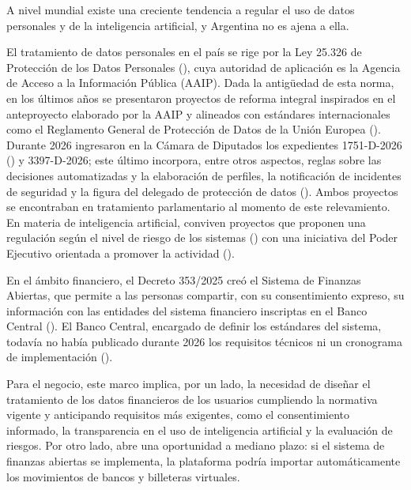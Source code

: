 A nivel mundial existe una creciente tendencia a regular el uso de datos
personales y de la inteligencia artificial, y Argentina no es ajena a
ella.

El tratamiento de datos personales en el país se rige por la Ley 25.326
de Protección de los Datos Personales (), cuya autoridad de
aplicación es la Agencia de Acceso a la Información Pública (AAIP). Dada
la antigüedad de esta norma, en los últimos años se presentaron
proyectos de reforma integral inspirados en el anteproyecto elaborado
por la AAIP y alineados con estándares internacionales como el
Reglamento General de Protección de Datos de la Unión Europea
(). Durante 2026 ingresaron en la
Cámara de Diputados los expedientes 1751-D-2026
() y 3397-D-2026;
este último incorpora, entre otros aspectos, reglas sobre las decisiones
automatizadas y la elaboración de perfiles, la notificación de
incidentes de seguridad y la figura del delegado de protección de datos
(). Ambos
proyectos se encontraban en tratamiento parlamentario al momento de este
relevamiento. En materia de inteligencia artificial, conviven proyectos
que proponen una regulación según el nivel de riesgo de los sistemas
() con una iniciativa del Poder
Ejecutivo orientada a promover la actividad
().

En el ámbito financiero, el Decreto 353/2025 creó el Sistema de Finanzas
Abiertas, que permite a las personas compartir, con su consentimiento
expreso, su información con las entidades del sistema financiero
inscriptas en el Banco Central (). El Banco Central, encargado de definir los estándares
del sistema, todavía no había publicado durante 2026 los requisitos
técnicos ni un cronograma de implementación
().

Para el negocio, este marco implica, por un lado, la necesidad de
diseñar el tratamiento de los datos financieros de los usuarios
cumpliendo la normativa vigente y anticipando requisitos más exigentes,
como el consentimiento informado, la transparencia en el uso de
inteligencia artificial y la evaluación de riesgos. Por otro lado, abre
una oportunidad a mediano plazo: si el sistema de finanzas abiertas se
implementa, la plataforma podría importar automáticamente los
movimientos de bancos y billeteras virtuales.

